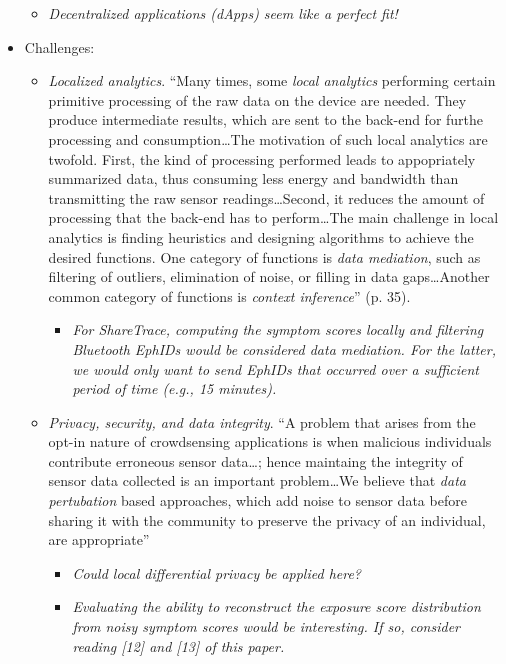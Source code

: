 \begin{itemize}
	\begin{itemize}
	\item \emph{Decentralized applications (dApps) seem like a perfect fit!}
	\end{itemize}
\item Challenges:
	\begin{itemize}
	\item \emph{Localized analytics}. ``Many times, some \emph{local analytics} performing certain primitive processing of the raw data on the device are needed. They produce intermediate results, which are sent to the back-end for furthe processing and consumption{\ldots}The motivation of such local analytics are twofold. First, the kind of processing performed leads to appopriately summarized data, thus consuming less energy and bandwidth than transmitting the raw sensor readings{\ldots}Second, it reduces the amount of processing that the back-end has to perform{\ldots}The main challenge in local analytics is finding heuristics and designing algorithms to achieve the desired functions. One category of functions is \emph{data mediation}, such as filtering of outliers, elimination of noise, or filling in data gaps{\ldots}Another common category of functions is \emph{context inference}'' (p. 35).
		\begin{itemize}
		\item \emph{For ShareTrace, computing the symptom scores locally and filtering Bluetooth EphIDs would be considered data mediation. For the latter, we would only want to send EphIDs that occurred over a sufficient period of time (e.g., 15 minutes).}
		\end{itemize}
	\item \emph{Privacy, security, and data integrity}. ``A problem that arises from the opt-in nature of crowdsensing applications is when malicious individuals contribute erroneous sensor data{\ldots}; hence maintaing the integrity of sensor data collected is an important problem{\ldots}We believe that \emph{data pertubation} based approaches, which add noise to sensor data before sharing it with the community to preserve the privacy of an individual, are appropriate''
		\begin{itemize}
		\item \emph{Could local differential privacy be applied here?}
		\item \emph{Evaluating the ability to reconstruct the exposure score distribution from noisy symptom scores would be interesting. If so, consider reading [12] and [13] of this paper.}
		\end{itemize}

\end{itemize}
\end{itemize}
